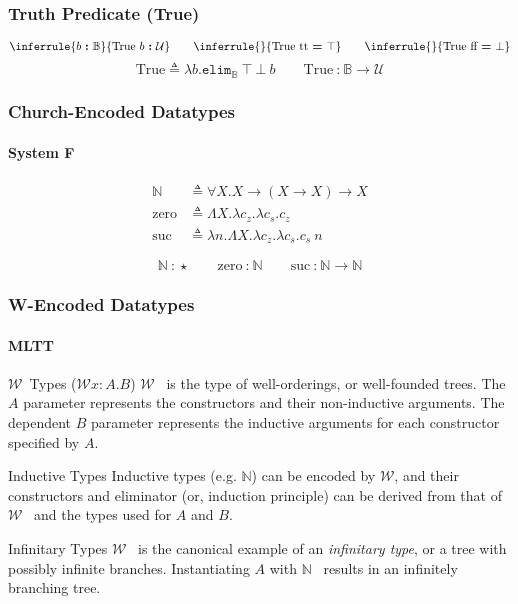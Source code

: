 \documentclass[mathserif]{beamer}
\newcommand{\txt}[1]{\textrm{#1}}
\newcommand{\defeq}[0]{\ensuremath{\triangleq}}
\newcommand{\isterm}[2]{\ensuremath{#1 ~\textbf{{:}}~ #2}}
\newcommand{\eqtype}[2]{\ensuremath{#1 ~\textbf{=}~ #2}}
\newcommand{\Arr}[2]{\ensuremath{#1 \rightarrow #2}}
\newcommand{\Allv}[2]{\ensuremath{\forall #1. #2}}
\newcommand{\All}[1]{\Allv{X}{#1}}
\newcommand{\allv}[2]{\ensuremath{\Lambda #1. #2}}
\newcommand{\all}[1]{\allv{X}{#1}}
\newcommand{\funv}[2]{\ensuremath{\lambda #1. #2}}
\newcommand{\app}[2]{\ensuremath{#1~#2}}
\newcommand{\Type}[0]{\ensuremath{\mathcal{U}}}
\newcommand{\Unit}[0]{\ensuremath{\top}}
\newcommand{\Bot}[0]{\ensuremath{\bot}}
\newcommand{\Truek}[0]{\txt{True}}
\newcommand{\True}[1]{\ensuremath{\Truek~#1}}
\newcommand{\Bool}[0]{\ensuremath{\mathbb{B}}}
\newcommand{\true}[0]{\ensuremath{\txt{tt}}}
\newcommand{\false}[0]{\ensuremath{\txt{ff}}}
\newcommand{\elimBool}[3]{\ensuremath{\texttt{elim}_{\Bool}~#1~#2~#3}}
\newcommand{\Nat}[0]{\ensuremath{\mathbb{N}}}
\newcommand{\zero}[0]{\ensuremath{\txt{zero}}}
\newcommand{\suck}[0]{\ensuremath{\txt{suc}}}
\newcommand{\Wellk}[0]{\ensuremath{\mathcal{W}}}
\newcommand{\Wellv}[3]{\ensuremath{\Wellk #1{:}#2. #3}}
\newcommand{\Well}[2]{\Wellv{x}{#1}{#2}}
\begin{document}
\begin{frame}
\frametitle{Truth Predicate (\Truek)}

$$
\inferrule{
  {\isterm{b}{\Bool}}
}
{\isterm{\True{b}}{\Type}}
\qquad
\inferrule{{}}
{\eqtype{\True{\true}}{\Unit}}
\qquad
\inferrule{{}}
{\eqtype{\True{\false}}{\Bot}}
$$
\dotfill
$$
\Truek \defeq \funv{b}{\elimBool{\Unit}{\Bot}{b}}
\qquad
\isterm{\Truek}{\Arr{\Bool}{\Type}}
$$

\end{frame}

\begin{frame}
\frametitle{Church-Encoded Datatypes}
\framesubtitle{System F}

\begin{align*}
\Nat &\defeq \All{\Arr{X}{\Arr{(\Arr{X}{X})}{X}}} \\
\zero &\defeq \all{\funv{c_z}{\funv{c_s}{c_z}}} \\
\suck &\defeq \funv{n}{\all{\funv{c_z}{\funv{c_s}{\app{c_s}{n}}}}}
\end{align*}

$$
\isterm{\Nat}{\star}
\qquad
\isterm{\zero}{\Nat}
\qquad
\isterm{\suck}{\Arr{\Nat}{\Nat}}
$$

\end{frame}

\begin{frame}
\frametitle{W-Encoded Datatypes}
\framesubtitle{MLTT}

\begin{block}{\Wellk~Types (\Well{A}{B})}
\Wellk~ is the type of well-orderings,
or well-founded trees.
The $A$ parameter represents the constructors and their
non-inductive arguments. The dependent $B$ parameter represents
the inductive arguments for each constructor
specified by $A$.
\end{block}

\begin{block}{Inductive Types}
Inductive types (e.g. \Nat) can be encoded by \Wellk, and
their constructors and eliminator (or, induction principle)
can be derived from that of \Wellk~ and the types used for
$A$ and $B$.
\end{block}

\begin{block}{Infinitary Types}
\Wellk~ is the canonical example of an \textit{infinitary type},
or a tree with possibly infinite branches. Instantiating $A$
with \Nat~ results in an infinitely branching tree.
\end{block}

\end{frame}
\end{document}
